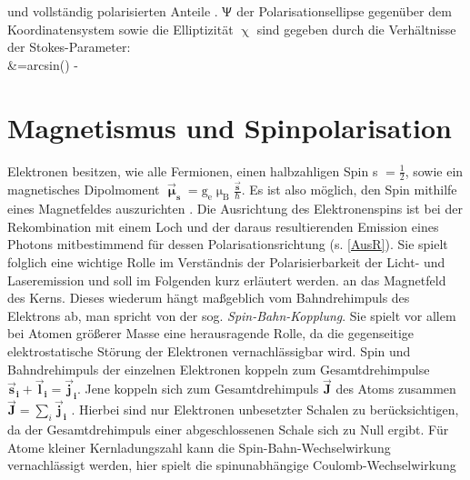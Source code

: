 und vollständig polarisierten Anteile \cite{Schaefer.2007}. %
$\Uppsi$ der Polarisationsellipse gegenüber dem Koordinatensystem sowie die
Elliptizität $\upchi$ sind gegeben durch die Verhältnisse der Stokes-Parameter:
{}\qquad{} \leq \Psi \leq \pi \text{ ,}\\ %
&=arcsin\left(\right)\qquad {}\qquad\quad
- \leq \chi \leq {}  %
\section{Magnetismus und Spinpolarisation} Elektronen besitzen, wie alle
Fermionen, einen halbzahligen Spin  s $= \frac{1}{2}$, sowie ein magnetisches
Dipolmoment
$\vec{\boldsymbol{\upmu}}_{\textbf{s}}=\text{g}_\text{e}\upmu_\text{B}\frac{\vec{\textbf{s}}}{\hbar}$.
Es ist also möglich, den Spin mithilfe eines Magnetfeldes auszurichten
\cite{Gross.2014}. Die Ausrichtung des Elektronenspins ist bei der Rekombination
mit einem Loch und der daraus resultierenden Emission eines Photons
mitbestimmend für dessen Polarisationsrichtung (s. \autoref{AusR}). Sie spielt
folglich eine wichtige Rolle im Verständnis der Polarisierbarkeit der Licht- und
Laseremission und soll im Folgenden kurz erläutert werden.
an das Magnetfeld des Kerns. Dieses wiederum hängt maßgeblich vom Bahndrehimpuls
des Elektrons ab, man spricht von der sog. \textit{Spin-Bahn-Kopplung}. Sie
spielt vor allem bei Atomen größerer Masse eine herausragende Rolle, da die
gegenseitige elektrostatische Störung der Elektronen vernachlässigbar wird. Spin
und Bahndrehimpuls der einzelnen Elektronen koppeln zum Gesamtdrehimpulse
$\vec{\textbf{s}}_{\textbf{i}} + \vec{\textbf{l}}_{\textbf{i}}=
\vec{\textbf{j}}_{\textbf{i}}$. Jene koppeln sich zum Gesamtdrehimpuls
$\vec{\textbf{J}}$ des Atoms zusammen $ \vec{\textbf{J}}=\sum_i
\vec{\textbf{j}}_{\textbf{i}}$ . Hierbei sind nur Elektronen unbesetzter Schalen
zu berücksichtigen, da der Gesamtdrehimpuls einer abgeschlossenen Schale sich zu
Null ergibt. Für Atome kleiner Kernladungszahl kann die Spin-Bahn-Wechselwirkung
vernachlässigt werden, hier spielt die spinunabhängige Coulomb-Wechselwirkung
